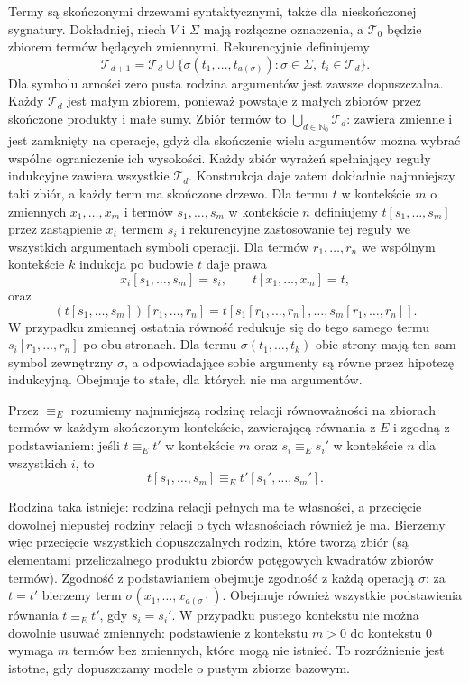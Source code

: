 Termy są skończonymi drzewami syntaktycznymi, także dla nieskończonej sygnatury. Dokładniej, niech $V$ i $\Sigma$ mają rozłączne oznaczenia, a $\mathcal T_0$ będzie zbiorem termów będących zmiennymi. Rekurencyjnie definiujemy
\[
 \mathcal T_{d+1}=\mathcal T_d\cup
 \{\sigma(t_1,\ldots,t_{a(\sigma)}):\sigma\in\Sigma,\
                   t_i\in\mathcal T_d\}.
\]
Dla symbolu arności zero pusta rodzina argumentów jest zawsze dopuszczalna. Każdy $\mathcal T_d$ jest małym zbiorem, ponieważ powstaje z małych zbiorów przez skończone produkty i małe sumy. Zbiór termów to $\bigcup_{d\in\mathbb N_0}\mathcal T_d$: zawiera zmienne i jest zamknięty na operacje, gdyż dla skończenie wielu argumentów można wybrać wspólne ograniczenie ich wysokości. Każdy zbiór wyrażeń spełniający reguły indukcyjne zawiera wszystkie $\mathcal T_d$. Konstrukcja daje zatem dokładnie najmniejszy taki zbiór, a każdy term ma skończone drzewo. Dla termu $t$ w kontekście $m$ o zmiennych $x_1,\ldots,x_m$ i termów $s_1,\ldots,s_m$ w kontekście $n$ definiujemy $t[s_1,\ldots,s_m]$ przez zastąpienie $x_i$ termem $s_i$ i rekurencyjne zastosowanie tej reguły we wszystkich argumentach symboli operacji. Dla termów $r_1,\ldots,r_n$ we wspólnym kontekście $k$ indukcja po budowie $t$ daje prawa
\[
 x_i[s_1,\ldots,s_m]=s_i,\qquad
 t[x_1,\ldots,x_m]=t,
\]
oraz
\[
 (t[s_1,\ldots,s_m])[r_1,\ldots,r_n]
 =t[s_1[r_1,\ldots,r_n],\ldots,s_m[r_1,\ldots,r_n]].
\]
W przypadku zmiennej ostatnia równość redukuje się do tego samego termu $s_i[r_1,\ldots,r_n]$ po obu stronach. Dla termu $\sigma(t_1,\ldots,t_k)$ obie strony mają ten sam symbol zewnętrzny $\sigma$, a odpowiadające sobie argumenty są równe przez hipotezę indukcyjną. Obejmuje to stałe, dla których nie ma argumentów.

\begin{definicja}\label{cat:def:lawvere-congruence}
Przez $\equiv_E$ rozumiemy najmniejszą rodzinę relacji równoważności na zbiorach termów w każdym skończonym kontekście, zawierającą równania z $E$ i zgodną z podstawianiem: jeśli $t\equiv_E t'$ w kontekście $m$ oraz $s_i\equiv_E s_i'$ w kontekście $n$ dla wszystkich $i$, to
\[
 t[s_1,\ldots,s_m]\equiv_E t'[s_1',\ldots,s_m'].
\]
\end{definicja}
Rodzina taka istnieje: rodzina relacji pełnych ma te własności, a przecięcie dowolnej niepustej rodziny relacji o tych własnościach również je ma. Bierzemy więc przecięcie wszystkich dopuszczalnych rodzin, które tworzą zbiór (są elementami przeliczalnego produktu zbiorów potęgowych kwadratów zbiorów termów). Zgodność z podstawianiem obejmuje zgodność z każdą operacją $\sigma$: za $t=t'$ bierzemy term $\sigma(x_1,\ldots,x_{a(\sigma)})$. Obejmuje również wszystkie podstawienia równania $t\equiv_E t'$, gdy $s_i=s_i'$. W przypadku pustego kontekstu nie można dowolnie usuwać zmiennych: podstawienie z kontekstu $m>0$ do kontekstu $0$ wymaga $m$ termów bez zmiennych, które mogą nie istnieć. To rozróżnienie jest istotne, gdy dopuszczamy modele o pustym zbiorze bazowym.

